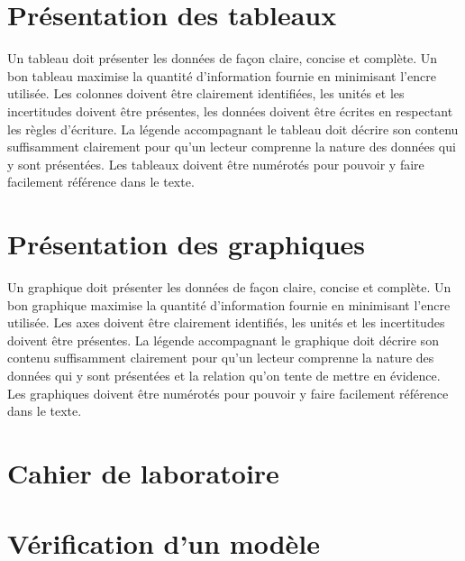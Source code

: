 \documentclass[nofonts]{tufte-handout}
\begin{document}
\section{Présentation des tableaux}

Un tableau doit présenter les données de façon claire, concise et complète. Un
bon tableau maximise la quantité d'information fournie en minimisant l'encre
utilisée. Les colonnes doivent être clairement identifiées, les unités et les
incertitudes doivent être présentes, les données doivent être écrites en
respectant les règles d'écriture. La légende accompagnant le tableau doit
décrire son contenu suffisamment clairement pour qu'un lecteur comprenne la
nature des données qui y sont présentées. Les tableaux doivent être numérotés
pour pouvoir y faire facilement référence dans le texte.


\section{Présentation des graphiques}

Un graphique doit présenter les données de façon claire, concise et complète. Un
bon graphique maximise la quantité d'information fournie en minimisant l'encre
utilisée. Les axes doivent être clairement identifiés, les unités et les
incertitudes doivent être présentes. La légende accompagnant le graphique doit
décrire son contenu suffisamment clairement pour qu'un lecteur comprenne la
nature des données qui y sont présentées et la relation qu'on tente de mettre en
évidence. Les graphiques doivent être numérotés pour pouvoir y faire facilement
référence dans le texte.


\section{Cahier de laboratoire}
\section{Vérification d'un modèle}






\end{document}
